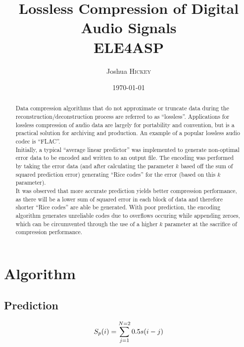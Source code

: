 \documentclass{article}
\title{Lossless Compression of Digital Audio Signals \\ ELE4ASP} %
\author{Joshua \textsc{Hickey}} %
\date{\today} %
\begin{document}
\maketitle %



\begin{abstract}

Data compression algorithms that do not approximate or truncate data during the reconstruction/deconstruction process are referred to as ``lossless''. Applications for lossless compression of audio data are largely for portability and convention, but is a practical solution for archiving and production. An example of a popular lossless audio codec is ``FLAC''.\\

Initially, a typical ``average linear predictor'' was implemented to generate non-optimal error data to be encoded and written to an output file. The encoding was performed by taking the error data (and after calculating the parameter $k$ based off the sum of squared prediction error) generating ``Rice codes'' for the error (based on this $k$ parameter).\\

It was observed that more accurate prediction yields better compression performance, as there will be a lower sum of squared error in each block of data and therefore shorter ``Rice codes'' are able be generated. With poor prediction, the encoding algorithm generates unreliable codes due to overflows occuring while appending zeroes, which can be circumvented through the use of a higher $k$ parameter at the sacrifice of compression performance.\\

\end{abstract}

\section*{Algorithm}

\subsection*{Prediction}
\begin{equation}
S_p(i) = \sum_{j=1}^{N=2} 0.5s(i-j) \\
\end{equation}
\end{document}
